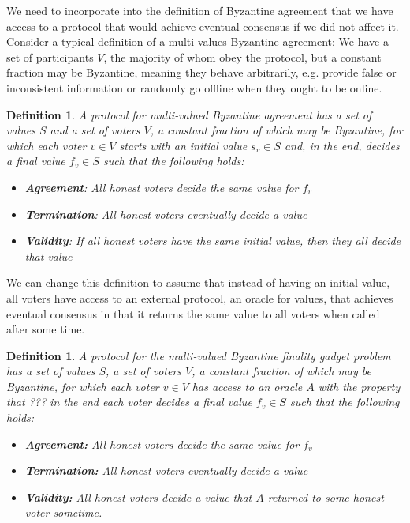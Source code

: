 \documentclass{article}
\newtheorem{definition}[theorem]{Definition}
\begin{document}
We need to incorporate into the definition of Byzantine agreement that we have access to a protocol that would achieve eventual consensus if we did not affect it.
Consider a typical definition of a multi-values Byzantine agreement: 
We have a set of participants $V$, the majority of whom obey the protocol, but a constant fraction may be Byzantine, meaning they behave arbitrarily, e.g. provide false or inconsistent information or randomly go offline when they ought to be online.

\begin{definition} A protocol for {\em multi-valued Byzantine agreement} has a set of values $S$ and a set of voters $V$, a constant fraction of which may be Byzantine, for which each voter $v \in V$ starts with an initial value $s_v \in S$ and, in the end, decides a final value $f_v \in S$ such that the following holds:

\begin{itemize}
\item {\bf Agreement}: All honest voters decide the same value for $f_v$
\item {\bf Termination}: All honest voters eventually decide a value
\item {\bf Validity}: If all honest voters have the same initial value, then they all decide that value
\end{itemize}

\end{definition}

We can change this definition to assume that instead of having an initial value, all voters have access to an external protocol, an oracle for values, that achieves eventual consensus in that it returns the same value to all voters when called after some time.

\begin{definition} A protocol for the {\em multi-valued Byzantine finality gadget problem} has a set of values $S$, a set of voters $V$, a constant fraction of which may be Byzantine, for which each voter $v \in V$ has access to an oracle $A$ with the property that ??? in the end each voter decides a final value $f_v \in S$ such that the following holds:

\begin{itemize}
\item {\bf Agreement:} All honest voters decide the same value for $f_v$
\item {\bf Termination:} All honest voters eventually decide a value
\item {\bf Validity:} All honest voters decide a value that $A$ returned to some honest voter sometime.
\end{itemize}

\end{definition}
\end{document}
